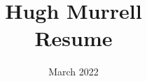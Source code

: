 \documentclass[12pt]{article}
\title{
           Hugh Murrell \\
           Resume \\
       }
\date{March 2022}
\begin{document}
\maketitle


%

\small
\end{document}
